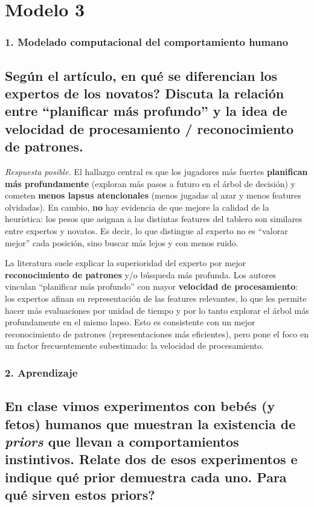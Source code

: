 \documentclass[11pt, a4paper]{article}
\newcommand{\pregunta}[1]{\subsection{#1}}
\newcommand{\eje}[1]{\subsubsection{#1}}
\begin{document}
\section{Modelo 3}

\eje{1. Modelado computacional del comportamiento humano}
\pregunta{Seg\'un el art\'iculo, \textquestiondown en qu\'e se diferencian los expertos de los novatos? Discuta la relaci\'on entre ``planificar m\'as profundo'' y la idea de velocidad de procesamiento / reconocimiento de patrones.}

\begin{respuesta}
\textit{Respuesta posible.} El hallazgo central es que los jugadores m\'as fuertes \textbf{planifican m\'as profundamente} (exploran m\'as pasos a futuro en el \'arbol de decisi\'on) y cometen \textbf{menos lapsus atencionales} (menos jugadas al azar y menos features olvidadas). En cambio, \textbf{no} hay evidencia de que mejore la calidad de la heur\'istica: los pesos que asignan a las distintas features del tablero son similares entre expertos y novatos. Es decir, lo que distingue al experto no es ``valorar mejor'' cada posici\'on, sino buscar m\'as lejos y con menos ruido.

La literatura suele explicar la superioridad del experto por mejor \textbf{reconocimiento de patrones} y/o b\'usqueda m\'as profunda. Los autores vinculan ``planificar m\'as profundo'' con mayor \textbf{velocidad de procesamiento}: los expertos afinan su representaci\'on de las features relevantes, lo que les permite hacer m\'as evaluaciones por unidad de tiempo y por lo tanto explorar el \'arbol m\'as profundamente en el mismo lapso. Esto es consistente con un mejor reconocimiento de patrones (representaciones m\'as eficientes), pero pone el foco en un factor frecuentemente subestimado: la velocidad de procesamiento.
\end{respuesta}

\eje{2. Aprendizaje}
\pregunta{En clase vimos experimentos con beb\'es (y fetos) humanos que muestran la existencia de \emph{priors} que llevan a comportamientos instintivos. Relate dos de esos experimentos e indique qu\'e prior demuestra cada uno. \textquestiondown Para qu\'e sirven estos priors?}
\end{document}
